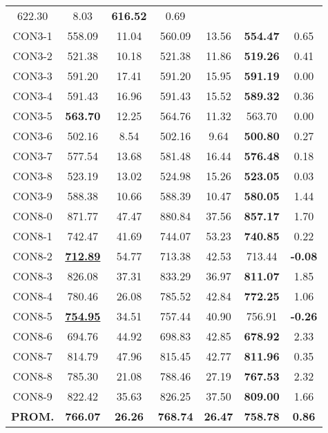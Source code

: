 \begin{table}[ht]
\begin{tabular}{c c c c c c c}
622.30 & 8.03 & \bf{616.52} & 
0.69\\CON3-1 & 558.09 & 11.04 & 
560.09 & 13.56 & \bf{554.47} & 
0.65\\CON3-2 & 521.38 & 10.18 & 
521.38 & 11.86 & \bf{519.26} & 
0.41\\CON3-3 & 591.20 & 17.41 & 
591.20 & 15.95 & \bf{591.19} & 
0.00\\CON3-4 & 591.43 & 16.96 & 
591.43 & 15.52 & \bf{589.32} & 
0.36\\CON3-5 & \bf{563.70} & 12.25 & 
564.76 & 11.32 & 563.70 & 0.00\\
CON3-6 & 502.16 & 8.54 & 
502.16 & 9.64 & \bf{500.80} & 
0.27\\CON3-7 & 577.54 & 13.68 & 
581.48 & 16.44 & \bf{576.48} & 
0.18\\CON3-8 & 523.19 & 13.02 & 
524.98 & 15.26 & \bf{523.05} & 
0.03\\CON3-9 & 588.38 & 10.66 & 
588.39 & 10.47 & \bf{580.05} & 
1.44\\CON8-0 & 871.77 & 47.47 & 
880.84 & 37.56 & \bf{857.17} & 
1.70\\CON8-1 & 742.47 & 41.69 & 
744.07 & 53.23 & \bf{740.85} & 
0.22\\CON8-2 & \bf{\underline{712.89}} & 54.77 & 
713.38 & 42.53 & 713.44 & 
\bf{-0.08}\\CON8-3 & 826.08 & 37.31 & 
833.29 & 36.97 & \bf{811.07} & 
1.85\\CON8-4 & 780.46 & 26.08 & 
785.52 & 42.84 & \bf{772.25} & 
1.06\\CON8-5 & \bf{\underline{754.95}} & 34.51 & 
757.44 & 40.90 & 756.91 & 
\bf{-0.26}\\CON8-6 & 694.76 & 44.92 & 
698.83 & 42.85 & \bf{678.92} & 
2.33\\CON8-7 & 814.79 & 47.96 & 
815.45 & 42.77 & \bf{811.96} & 
0.35\\CON8-8 & 785.30 & 21.08 & 
788.46 & 27.19 & \bf{767.53} & 
2.32\\CON8-9 & 822.42 & 35.63 & 
826.25 & 37.50 & \bf{809.00} & 
1.66\\\bf{PROM.} & 
\bf{766.07} & \bf{26.26} & \bf{768.74} & \bf{26.47} & \bf{758.78} & \bf{0.86}\\[1ex]\hline
\end{tabular}
\label{table:nonlin}
\end{table} \clearpage